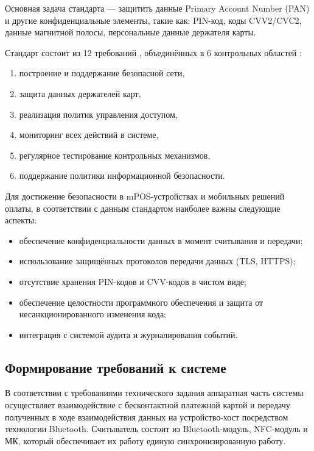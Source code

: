Основная задача стандарта — защитить данные Primary Account Number (PAN) и другие конфиденциальные элементы, такие как: PIN-код, коды CVV2/CVC2, данные магнитной полосы, персональные данные держателя карты.

Стандарт состоит из 12 требований , объединённых в 6 контрольных областей :

\begin{enumerate}
    \item построение и поддержание безопасной сети,
    \item защита данных держателей карт,
    \item реализация политик управления доступом,
    \item мониторинг всех действий в системе,
    \item регулярное тестирование контрольных механизмов,
    \item поддержание политики информационной безопасности.
\end{enumerate}

Для достижение безопасности в mPOS-устройствах и мобильных решений оплаты, в соответствии с данным стандартом наиболее важны следующие аспекты:

\begin{itemize}
    \item обеспечение конфиденциальности данных в момент считывания и передачи;
    \item использование защищённых протоколов передачи данных (TLS, HTTPS);
    \item отсутствие хранения PIN-кодов и CVV-кодов в чистом виде;
    \item обеспечение целостности программного обеспечения и защита от несанкционированного изменения кода;
    \item интеграция с системой аудита и журналирования событий.
\end{itemize}


\subsection{Формирование требований к системе}

В соответствии с требованиями технического задания аппаратная часть системы осуществляет взаимодействие с бесконтактной платежной картой и передачу полученных в ходе взаимодействия данных на устройство-хост посредством технологии Bluetooth.
Считыватель состоит из Bluetooth-модуль, NFC-модуль и МК, который обеспечивает их работу единую синхронизированную работу.

